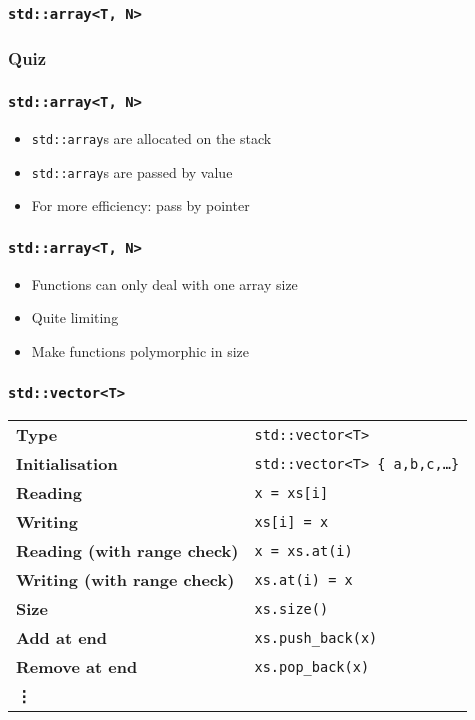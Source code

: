 \documentclass{../ucll-slides}
\begin{document}
\begin{frame}
  \frametitle{\tt std::array<T, N>}
\end{frame}

\begin{frame}
  \frametitle{Quiz}
\end{frame}

\begin{frame}
  \frametitle{\tt std::array<T, N>}
  \begin{itemize}
    \item {\tt std::array}s are allocated on the stack
    \item {\tt std::array}s are passed by value
    \item For more efficiency: pass by pointer
  \end{itemize}
\end{frame}

\begin{frame}
  \frametitle{\tt std::array<T, N>}
  \begin{itemize}
    \item Functions can only deal with one array size
    \item Quite limiting
    \item Make functions polymorphic in size
  \end{itemize}
\end{frame}

\begin{frame}
  \frametitle{\tt std::vector<T>}
  \begin{center}
    \begin{tabular}{ll}
      \bf Type & {\tt std::vector<T>} \\[2mm]
      \bf Initialisation & {\tt std::vector<T> \{ a,b,c,\dots \}} \\[2mm]
      \bf Reading & {\tt x = xs[i]} \\[2mm]
      \bf Writing & {\tt xs[i] = x} \\[2mm]
      \bf Reading (with range check) & {\tt x = xs.at(i)} \\[2mm]
      \bf Writing (with range check) & {\tt xs.at(i) = x} \\[2mm]
      \bf Size & {\tt xs.size()} \\[2mm]
      \bf Add at end & {\tt xs.push\_back(x)} \\[2mm]
      \bf Remove at end & {\tt xs.pop\_back(x)} \\[2mm]
      \bf \vdots
    \end{tabular}
  \end{center}
\end{frame}
\end{document}
